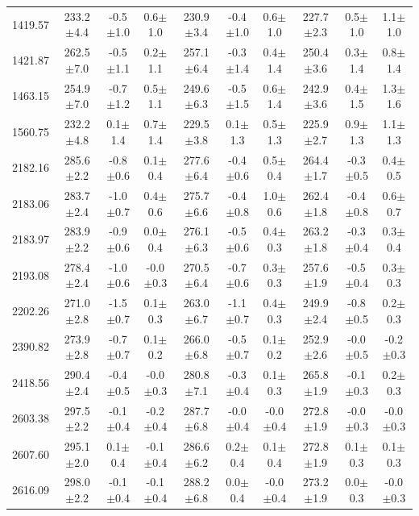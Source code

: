 \documentclass[agupp]{aguplus}              %
\begin{document}
\begin{article}
\begin{center}
\begin{table}[ht]
{\begin{tabular}{c|ccc|ccc|ccc}
1419.57 & 233.2$\pm$4.4 & -0.5$\pm$1.0 &  0.6$\pm$1.0 & 230.9$\pm$3.4 & -0.4$\pm$1.0 &  0.6$\pm$1.0 & 227.7$\pm$2.3 &  0.5$\pm$1.0 &  1.1$\pm$1.0 \\ 
1421.87 & 262.5$\pm$7.0 & -0.5$\pm$1.1 &  0.2$\pm$1.1 & 257.1$\pm$6.4 & -0.3$\pm$1.4 &  0.4$\pm$1.4 & 250.4$\pm$3.6 &  0.3$\pm$1.4 &  0.8$\pm$1.4 \\ 
1463.15 & 254.9$\pm$7.0 & -0.7$\pm$1.2 &  0.5$\pm$1.1 & 249.6$\pm$6.3 & -0.5$\pm$1.5 &  0.6$\pm$1.4 & 242.9$\pm$3.6 &  0.4$\pm$1.5 &  1.3$\pm$1.6 \\ 
1560.75 & 232.2$\pm$4.8 &  0.1$\pm$1.4 &  0.7$\pm$1.4 & 229.5$\pm$3.8 &  0.1$\pm$1.3 &  0.5$\pm$1.3 & 225.9$\pm$2.7 &  0.9$\pm$1.3 &  1.1$\pm$1.3 \\ 
\hline
2182.16 & 285.6$\pm$2.2 & -0.8$\pm$0.6 &  0.1$\pm$0.4 & 277.6$\pm$6.4 & -0.4$\pm$0.6 &  0.5$\pm$0.4 & 264.4$\pm$1.7 & -0.3$\pm$0.5 &  0.4$\pm$0.5 \\ 
2183.06 & 283.7$\pm$2.4 & -1.0$\pm$0.7 &  0.4$\pm$0.6 & 275.7$\pm$6.6 & -0.4$\pm$0.8 &  1.0$\pm$0.6 & 262.4$\pm$1.8 & -0.4$\pm$0.8 &  0.6$\pm$0.7 \\ 
2183.97 & 283.9$\pm$2.2 & -0.9$\pm$0.6 &  0.0$\pm$0.4 & 276.1$\pm$6.3 & -0.5$\pm$0.6 &  0.4$\pm$0.3 & 263.2$\pm$1.8 & -0.3$\pm$0.4 &  0.3$\pm$0.4 \\ 
2193.08 & 278.4$\pm$2.4 & -1.0$\pm$0.6 & -0.0$\pm$0.3 & 270.5$\pm$6.4 & -0.7$\pm$0.6 &  0.3$\pm$0.3 & 257.6$\pm$1.9 & -0.5$\pm$0.4 &  0.3$\pm$0.3 \\ 
2202.26 & 271.0$\pm$2.8 & -1.5$\pm$0.7 &  0.1$\pm$0.3 & 263.0$\pm$6.7 & -1.1$\pm$0.7 &  0.4$\pm$0.3 & 249.9$\pm$2.4 & -0.8$\pm$0.5 &  0.2$\pm$0.3 \\ 
2390.82 & 273.9$\pm$2.8 & -0.7$\pm$0.7 &  0.1$\pm$0.2 & 266.0$\pm$6.8 & -0.5$\pm$0.7 &  0.1$\pm$0.2 & 252.9$\pm$2.6 & -0.0$\pm$0.5 & -0.2$\pm$0.3 \\ 
\hline
2418.56 & 290.4$\pm$2.4 & -0.4$\pm$0.5 & -0.0$\pm$0.3 & 280.8$\pm$7.1 & -0.3$\pm$0.4 &  0.1$\pm$0.3 & 265.8$\pm$1.9 & -0.1$\pm$0.3 &  0.2$\pm$0.3 \\ 
2603.38 & 297.5$\pm$2.2 & -0.1$\pm$0.4 & -0.2$\pm$0.4 & 287.7$\pm$6.8 & -0.0$\pm$0.4 & -0.0$\pm$0.4 & 272.8$\pm$1.9 & -0.0$\pm$0.3 & -0.0$\pm$0.3 \\ 
2607.60 & 295.1$\pm$2.0 &  0.1$\pm$0.4 & -0.1$\pm$0.4 & 286.6$\pm$6.2 &  0.2$\pm$0.4 &  0.1$\pm$0.4 & 272.8$\pm$1.9 &  0.1$\pm$0.3 &  0.1$\pm$0.3 \\ 
2616.09 & 298.0$\pm$2.2 & -0.1$\pm$0.4 & -0.1$\pm$0.4 & 288.2$\pm$6.8 &  0.0$\pm$0.4 & -0.0$\pm$0.4 & 273.2$\pm$1.9 &  0.0$\pm$0.3 & -0.0$\pm$0.3 \\ 

\end{tabular}}
\end{table}
\end{center}
\end{article}
\end{document}
